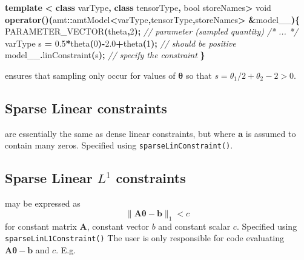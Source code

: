 \documentclass[
]{book}
\newenvironment{Shaded}{\begin{snugshade}}{\end{snugshade}}
\newcommand{\CommentTok}[1]{\textcolor[rgb]{0.56,0.35,0.01}{\textit{#1}}}
\newcommand{\DataTypeTok}[1]{\textcolor[rgb]{0.13,0.29,0.53}{#1}}
\newcommand{\DecValTok}[1]{\textcolor[rgb]{0.00,0.00,0.81}{#1}}
\newcommand{\FloatTok}[1]{\textcolor[rgb]{0.00,0.00,0.81}{#1}}
\newcommand{\KeywordTok}[1]{\textcolor[rgb]{0.13,0.29,0.53}{\textbf{#1}}}
\newcommand{\NormalTok}[1]{#1}
\newcommand{\OperatorTok}[1]{\textcolor[rgb]{0.81,0.36,0.00}{\textbf{#1}}}
\begin{document}
\begin{Shaded}
\begin{Highlighting}[]
\KeywordTok{template} \OperatorTok{\textless{}} \KeywordTok{class}\NormalTok{ varType}\OperatorTok{,} \KeywordTok{class}\NormalTok{ tensorType}\OperatorTok{,} \DataTypeTok{bool}\NormalTok{ storeNames}\OperatorTok{\textgreater{}}
  \DataTypeTok{void} \KeywordTok{operator}\OperatorTok{()(}\NormalTok{amt}\OperatorTok{::}\NormalTok{amtModel}\OperatorTok{\textless{}}\NormalTok{varType}\OperatorTok{,}\NormalTok{tensorType}\OperatorTok{,}\NormalTok{storeNames}\OperatorTok{\textgreater{}} \OperatorTok{\&}\NormalTok{model\_\_}\OperatorTok{)\{}
\NormalTok{    PARAMETER\_VECTOR}\OperatorTok{(}\NormalTok{theta}\OperatorTok{,}\DecValTok{2}\OperatorTok{);} \CommentTok{// parameter (sampled quantity)}
    \CommentTok{/* ... */}
\NormalTok{    varType s }\OperatorTok{=} \FloatTok{0.5}\OperatorTok{*}\NormalTok{theta}\OperatorTok{(}\DecValTok{0}\OperatorTok{){-}}\FloatTok{2.0}\OperatorTok{+}\NormalTok{theta}\OperatorTok{(}\DecValTok{1}\OperatorTok{);} \CommentTok{// should be positive}
\NormalTok{    model\_\_}\OperatorTok{.}\NormalTok{linConstraint}\OperatorTok{(}\NormalTok{s}\OperatorTok{);} \CommentTok{// specify the constraint}
  \OperatorTok{\}}
\end{Highlighting}
\end{Shaded}

ensures that sampling only occur for values of \(\boldsymbol \theta\) so that \(s=\theta_1 /2 + \theta_2-2>0\).

\hypertarget{sparse-linear-constraints}{%
\subsection{Sparse Linear constraints}\label{sparse-linear-constraints}}

are essentially the same as dense linear constraints, but where \(\mathbf a\) is assumed to contain many zeros. Specified using \texttt{sparseLinConstraint()}.

\hypertarget{sparse-linear-l1-constraints}{%
\subsection{\texorpdfstring{Sparse Linear \(L^1\) constraints}{Sparse Linear L\^{}1 constraints}}\label{sparse-linear-l1-constraints}}

may be expressed as
\[
\parallel \mathbf A \boldsymbol \theta - \mathbf b \parallel_1 < c
\]
for constant matrix \(\mathbf A\), constant vector \(b\) and constant scalar \(c\). Specified using \texttt{sparseLinL1Constraint()} The user is only responsible for code evaluating \(\mathbf A \boldsymbol \theta - \mathbf b\) and \(c\). E.g.
\end{document}
